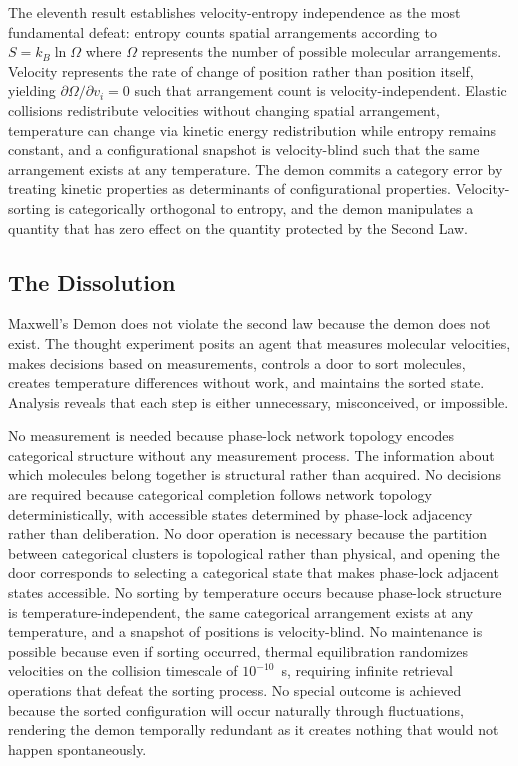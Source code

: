 \documentclass[12pt,a4paper]{article}
\theoremstyle{definition}
\theoremstyle{remark}
\begin{document}
The eleventh result establishes velocity-entropy independence as the most fundamental defeat: entropy counts spatial arrangements according to $S = k_B \ln \Omega$ where $\Omega$ represents the number of possible molecular arrangements. Velocity represents the rate of change of position rather than position itself, yielding $\partial \Omega / \partial v_i = 0$ such that arrangement count is velocity-independent. Elastic collisions redistribute velocities without changing spatial arrangement, temperature can change via kinetic energy redistribution while entropy remains constant, and a configurational snapshot is velocity-blind such that the same arrangement exists at any temperature. The demon commits a category error by treating kinetic properties as determinants of configurational properties. Velocity-sorting is categorically orthogonal to entropy, and the demon manipulates a quantity that has zero effect on the quantity protected by the Second Law.

\subsection{The Dissolution}

Maxwell's Demon does not violate the second law because the demon does not exist. The thought experiment posits an agent that measures molecular velocities, makes decisions based on measurements, controls a door to sort molecules, creates temperature differences without work, and maintains the sorted state. Analysis reveals that each step is either unnecessary, misconceived, or impossible.

No measurement is needed because phase-lock network topology encodes categorical structure without any measurement process. The information about which molecules belong together is structural rather than acquired. No decisions are required because categorical completion follows network topology deterministically, with accessible states determined by phase-lock adjacency rather than deliberation. No door operation is necessary because the partition between categorical clusters is topological rather than physical, and opening the door corresponds to selecting a categorical state that makes phase-lock adjacent states accessible. No sorting by temperature occurs because phase-lock structure is temperature-independent, the same categorical arrangement exists at any temperature, and a snapshot of positions is velocity-blind. No maintenance is possible because even if sorting occurred, thermal equilibration randomizes velocities on the collision timescale of $10^{-10}$~s, requiring infinite retrieval operations that defeat the sorting process. No special outcome is achieved because the sorted configuration will occur naturally through fluctuations, rendering the demon temporally redundant as it creates nothing that would not happen spontaneously.
\end{document}
